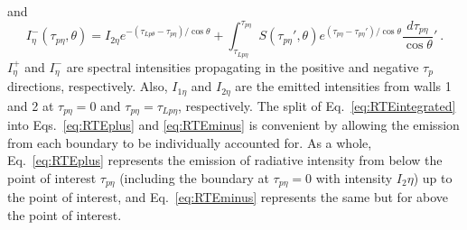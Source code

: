 and
\begin{equation}
    I^-_\eta{}(\tau_{p\eta},\theta) = I_{2\eta{}}e^{-(\tau_{Lp\theta}-\tau_{p\eta})/\cos{\theta}} + 
    \int_{\tau_{Lp\eta}}^{\tau_{p\eta}}{S(\tau_{p\eta}',\theta)e^{(\tau_{p\eta}-\tau_{p\eta}')/\cos{\theta}}}\frac{d\tau_{p\eta}}{\cos{\theta}}' \ .
    \label{eq:RTEminus}
\end{equation}
$I^+_\eta$ and $I^-_\eta$ are spectral intensities propagating in the positive and negative $\tau_{p}$ directions, respectively. Also, $I_{1\eta}$ and $I_{2\eta}$ are the emitted intensities from walls 1 and 2 at $\tau_{p\eta}=0$ and $\tau_{p\eta}=\tau_{Lp\eta}$, respectively. The split of Eq.~\ref{eq:RTEintegrated} into Eqs.~\ref{eq:RTEplus} and \ref{eq:RTEminus} is convenient by allowing the emission from each boundary to be individually accounted for. As a whole, Eq.~\ref{eq:RTEplus} represents the emission of radiative intensity from below the point of interest $\tau_{p\eta}$ (including the boundary at $\tau_{p\eta}=0$ with intensity $I_2{\eta}$) up to the point of interest, and Eq.~\ref{eq:RTEminus} represents the same but for above the point of interest.

